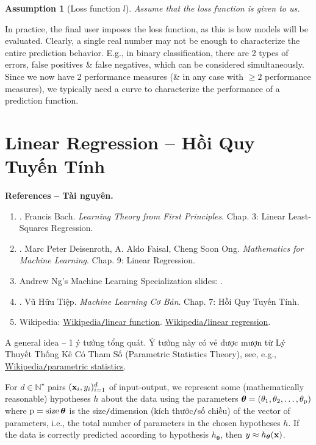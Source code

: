 \documentclass{article}
\newtheorem{assumption}{Assumption}
\begin{document}
\begin{assumption}[Loss function $l$]
	Assume that the loss function is given to us.
\end{assumption}
In practice, the final user imposes the loss function, as this is how models will be evaluated. Clearly, a single real number may not be enough to characterize the entire prediction behavior. E.g., in binary classification, there are 2 types of errors, false positives \& false negatives, which can be considered simultaneously. Since we now have 2 performance measures (\& in any case with $\ge2$ performance measures), we typically need a curve to characterize the performance of a prediction function.


\section{Linear Regression -- Hồi Quy Tuyến Tính}
\textbf{\textsf{References -- Tài nguyên.}}
\begin{enumerate}
	\item \cite{Bach2024}. {\sc Francis Bach}. {\it Learning Theory from First Principles}. Chap. 3: Linear Least-Squares Regression.
	\item \cite{Deisenroth_Faisal_Ong2024}. {\sc Marc Peter Deisenroth, A. Aldo Faisal, Cheng Soon Ong}. {\it Mathematics for Machine Learning}. Chap. 9: Linear Regression.
	\item {\sc Andrew Ng}'s Machine Learning Specialization slides: \url{}.
	\item \cite{Tiep_ML_co_ban}. {\sc Vũ Hữu Tiệp}. {\it Machine Learning Cơ Bản}. Chap. 7: Hồi Quy Tuyến Tính.
	\item Wikipedia: \href{https://en.wikipedia.org/wiki/Linear_function}{Wikipedia{\tt/}linear function}. \href{https://en.wikipedia.org/wiki/Linear_regression}{Wikipedia{\tt/}linear regression}.
\end{enumerate}
{\sf A general idea -- 1 ý tưởng tổng quát.} Ý tưởng này có vẻ được mượn từ Lý Thuyết Thống Kê Có Tham Số (Parametric Statistics Theory), see, e.g., \href{https://en.wikipedia.org/wiki/Parametric_statistics}{Wikipedia{\tt/}parametric statistics}.

For $d\in\mathbb{N}^\star$ pairs $({\bf x}_i,y_i)_{i=1}^d$ of input-output, we represent some (mathematically reasonable) hypotheses $h$ about the data using the parameters $\boldsymbol{\theta} = (\theta_1,\theta_2,\ldots,\theta_{\rm p})$ where ${\rm p} = \operatorname{size}\boldsymbol{\theta}$ is the size{\tt/}dimension (kích thước{\tt/}số chiều) of the vector of parameters, i.e., the total number of parameters in the chosen hypotheses $h$. If the data is correctly predicted according to hypothesis $h_{\boldsymbol{\theta}}$, then $y\approx h_{\boldsymbol{\theta}}({\bf x})$.
\end{document}
